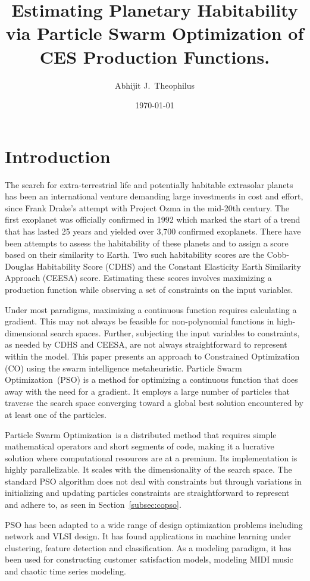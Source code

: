 \documentclass[10pt]{article}
\title{Estimating Planetary Habitability via Particle Swarm Optimization of CES Production Functions.}
\author{Abhijit J.\ Theophilus}
\date{\today}
\newcommand{\pso}{Particle Swarm Optimization}
\begin{document}
\maketitle


\section{Introduction}\label{sec:intro}

The search for extra-terrestrial life and potentially habitable extrasolar planets has been an international venture
demanding large investments in cost and effort, since Frank Drake's attempt with Project Ozma in the mid-20th century.
The first exoplanet was officially confirmed in 1992 which marked the start of a trend that has lasted 25 years and
yielded over 3,700 confirmed exoplanets. There have been attempts to assess the habitability of these planets and to
assign a score based on their similarity to Earth. Two such habitability scores are the Cobb-Douglas Habitability Score
(CDHS) and the Constant Elasticity Earth Similarity Approach (CEESA) score. Estimating these scores involves maximizing
a production function while observing a set of constraints on the input variables.

Under most paradigms, maximizing a continuous function requires calculating a gradient. This may not always be feasible
for non-polynomial functions in high-dimensional search spaces. Further, subjecting the input variables to constraints,
as needed by CDHS and CEESA, are not always straightforward to represent within the model. This paper presents an
approach to Constrained Optimization (CO) using the swarm intelligence metaheuristic. \pso\ (PSO) is a method for
optimizing a continuous function that does away with the need for a gradient. It employs a large number of particles
that traverse the search space converging toward a global best solution encountered by at least one of the particles.

\pso\ is a distributed method that requires simple mathematical operators and short segments of code, making it a
lucrative solution where computational resources are at a premium. Its implementation is highly parallelizable. It
scales with the dimensionality of the search space. The standard PSO algorithm does not deal with constraints but
through variations in initializing and updating particles constraints are straightforward to represent and adhere to, as
seen in Section~\ref{subsec:copso}.

PSO has been adapted to a wide range of design optimization problems including network and VLSI design. It has found
applications in machine learning under clustering, feature detection and classification. As a modeling paradigm, it has
been used for constructing customer satisfaction models, modeling MIDI music and chaotic time series modeling.
\end{document}
